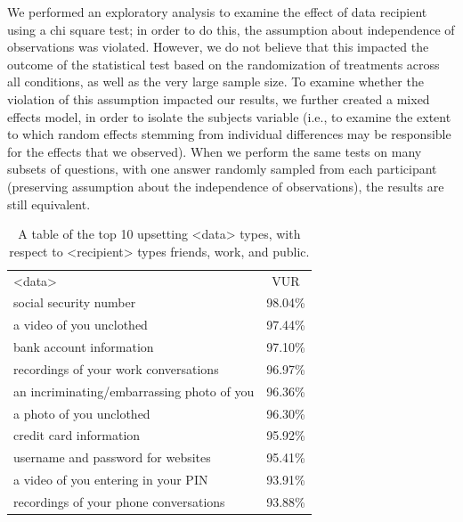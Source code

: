 \documentclass{acm_proc_article-sp}
\begin{document}

We performed an exploratory analysis to examine the effect of data recipient using a chi square test; in order to do this, the assumption about independence of observations was violated. However, we do not believe that this impacted the outcome of the statistical test based on the randomization of treatments across all conditions, as well as the very large sample size. To examine whether the violation of this assumption impacted our results, we further created a mixed effects model, in order to isolate the subjects variable (i.e., to examine the extent to which random effects stemming from individual differences may be responsible for the effects that we observed). When we perform the same tests on many subsets of questions, with one answer randomly sampled from each participant (preserving assumption about the independence of observations), the results are still equivalent. 

\begin{table}%
\begin{center}
\begin{tabular}{| l | c |}
<data> & VUR  \\
social security number & 98.04\% \\
a video of you unclothed & 97.44\% \\
bank account information & 97.10\% \\
recordings of your work conversations & 96.97\% \\
an incriminating/embarrassing photo of you & 96.36\% \\
a photo of you unclothed & 96.30\% \\
credit card information & 95.92\% \\
username and password for websites & 95.41\% \\
a video of you entering in your PIN & 93.91\% \\
recordings of your phone conversations & 93.88\% \\
\end{tabular}
\caption{A table of the top 10 upsetting <data> types, with respect to <recipient> types friends, work, and public.}
\label{sharedtop10}
\end{center}
\end{table}
\end{document}
